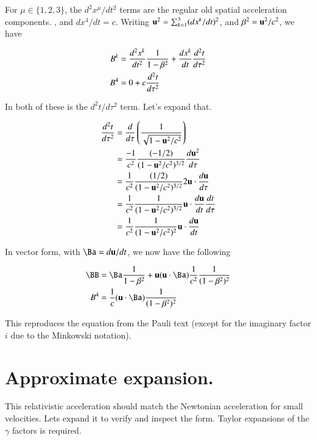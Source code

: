 For $\mu \in \{1,2,3\}$, the ${d^2 x^\mu }/{dt^2}$ terms are the regular old spatial acceleration components.
, and $dx^4/dt = c$.  Writing $\mathbf{u}^2 = \sum_{k=1}^3 (dx^k/dt)^2$, and $\beta^2 = \mathbf{u}^2/c^2$, we have

\begin{align*}
B^k &= \frac{d^2 x^k }{dt^2} \frac{1}{1-\beta^2} + \frac{d x^k }{dt} \frac{d^2t}{d\tau^2} \\
B^4 &= 0 + c \frac{d^2t}{d\tau^2} \\
\end{align*}

In both of these is the $d^2t/d\tau^2$ term.  Let's expand that.

\begin{align*}
\frac{d^2t}{d\tau^2} 
&= \frac{d}{d\tau} \left( \frac{1}{\sqrt{ 1 - \mathbf{u}^2/c^2 }} \right) \\
&= \frac{-1}{c^2} \frac{(-1/2) }{({ 1 - \mathbf{u}^2/c^2 })^{3/2}} \frac{d\mathbf{u}^2}{d\tau} \\
&= \frac{1}{c^2} \frac{(1/2) }{({ 1 - \mathbf{u}^2/c^2 })^{3/2}} 2 \mathbf{u} \cdot \frac{d\mathbf{u}}{d\tau} \\
&= \frac{1}{c^2} \frac{1}{({ 1 - \mathbf{u}^2/c^2 })^{3/2}} \mathbf{u} \cdot \frac{d\mathbf{u}}{dt} \frac{dt}{d\tau} \\
&= \frac{1}{c^2} \frac{1}{({ 1 - \mathbf{u}^2/c^2 })^{2}} \mathbf{u} \cdot \frac{d\mathbf{u}}{dt} \\
\end{align*}

In vector form, with $\Ba = d\Bu/dt$, we now have the following 

\begin{align}\label{eqn:acc_four_vector:accSpaceTimeSplit}
\BB &= \Ba \inv{1-\beta^2} + \Bu (\Bu \cdot \Ba) \inv{c^2} \inv{ (1-\beta^2)^2} \\
B^4 &= \inv{c} (\Bu \cdot \Ba) \inv{ (1-\beta^2)^2}
\end{align}

This reproduces the equation from the Pauli text (except for the imaginary factor $i$ due to the Minkowski notation).

\section{Approximate expansion. }

This relativistic acceleration should match the Newtonian acceleration for small velocities.  Lets expand it to verify and inspect the form.  Taylor expansions of the $\gamma$ factors is required.

